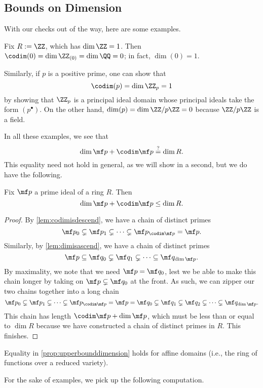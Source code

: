 \subsection{Bounds on Dimension}
With our checks out of the way, here are some examples.
\begin{example}
	Fix $R:=\ZZ$, which has $\dim\ZZ=1$. Then $\codim(0)=\dim\ZZ_{(0)}=\dim\QQ=0$; in fact, $\dim(0)=1$.
\end{example}
\begin{example}
	Similarly, if $p$ is a positive prime, one can show that
	\[\codim(p)=\dim\ZZ_p=1\]
	by showing that $\ZZ_p$ is a principal ideal domain whose principal ideals take the form $\left(p^\bullet\right)$. On the other hand, $\dim(p)=\dim\ZZ/p\ZZ=0$ because $\ZZ/p\ZZ$ is a field.
\end{example}
In all these examples, we see that
\[\dim\mf p+\codim\mf p\stackrel?=\dim R.\]
This equality need not hold in general, as we will show in a second, but we do have the following.
\begin{proposition} \label{prop:upperbounddimension}
	Fix $\mf p$ a prime ideal of a ring $R$. Then
	\[\dim\mf p+\codim\mf p\le\dim R.\]
\end{proposition}
\begin{proof}
	By \autoref{lem:codimisdescend}, we have a chain of distinct primes
	\[\mf p_0\subsetneq\mf p_1\subsetneq\cdots\subsetneq\mf p_{\codim\mf p}=\mf p.\]
	Similarly, by \autoref{lem:dimisascend}, we have a chain of distinct primes
	\[\mf p\subseteq\mf q_0\subsetneq\mf q_1\subsetneq\cdots\subseteq\mf q_{\dim\mf p}.\]
	By maximality, we note that we need $\mf p=\mf q_0$, lest we be able to make this chain longer by taking on $\mf p\subsetneq\mf q_0$ at the front. As such, we can zipper our two chains together into a long chain
	\[\mf p_0\subsetneq\mf p_1\subsetneq\cdots\subsetneq\mf p_{\codim\mf p}=\mf p=\mf q_0\subsetneq\mf q_1\subsetneq\mf q_2\subsetneq\cdots\subsetneq\mf q_{\dim\mf p}.\]
	This chain has length $\codim\mf p+\dim\mf p$, which must be less than or equal to $\dim R$ because we have constructed a chain of distinct primes in $R$. This finishes.
\end{proof}
\begin{remark}
	Equality in \autoref{prop:upperbounddimension} holds for affine domains (i.e., the ring of functions over a reduced variety).
\end{remark}
For the sake of examples, we pick up the following computation.
